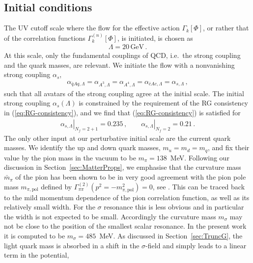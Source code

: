 \documentclass[%
reprint,
superscriptaddress,
showpacs,preprintnumbers,
 amsmath,amssymb,
 aps,
prd,
]{revtex4-1}
\def\eq#1{(\ref{#1})}
\def\sec#1{Section~\ref{#1}}
\begin{document}
\subsection{Initial conditions} \label{app:initial} The UV cutoff
scale where the flow for the effective action $\Gamma_k[\Phi]$, or
rather that of the correlation functions $\Gamma^{(n)}_k[\Phi]$, is
initiated, is chosen as
%
\begin{align}
\Lambda = 20\,\text{GeV}\,.
\end{align}
%
At this scale, only the fundamental couplings of QCD, i.e.\ the strong
coupling and the quark masses, are relevant. We initiate the flow with
a nonvanishing strong coupling $\alpha_s$,
%
\begin{align}\label{eq:initalalpha}
  \alpha_{\bar q Aq,\Lambda} =  \alpha_{A^3,\Lambda} = \alpha_{A^4,\Lambda}=
  \alpha_{\bar c A c,\Lambda}=\alpha_{s,\Lambda}\,,
\end{align}
%
such that all avatars of the strong coupling agree at the initial
scale. The initial strong coupling $\alpha_s (\Lambda)$ is constrained
by the requirement of the RG consistency in \eq{eq:RG-consistency},
and we find that \eq{eq:RG-consistency} is satisfied for
%
\begin{align}\label{eq:initalalpha-values}
  \left. \alpha_{s, \Lambda}\right|_{N_f=2+1}=0.235\,,\qquad \left.
  \alpha_{s, \Lambda}\right|_{N_f=2}=0.21\,.
\end{align}
%
The only other input at our perturbative initial scale are the current
quark masses. We identify the up and down quark masses, $m_u=m_d=m_q$,
and fix their value by the pion mass in the vacuum to be $m_\pi=138$\,
MeV. Following our discussion in \sec{sec:MatterProps}, we emphasise
that the curvature mass $\bar m_\pi$ of the pion has been shown to be
in very good agreement with the pion pole mass $m_{\pi,\textrm{pol}}$
defined by $\Gamma^{(2)}_{\pi\pi}(p^2 = -m^2_{\pi,\textrm{pol}})=0$,
see \cite{Helmboldt:2014iya, Pawlowski:2017gxj}. This can be traced
back to the mild momentum dependence of the pion correlation function,
\cite{ Helmboldt:2014iya, Mitter:2014wpa, Cyrol:2017ewj} as well as
its relatively small width. For the $\sigma$ resonance this is less
obvious and in particular the width is not expected to be
small. Accordingly the curvature mass $m_\sigma$ may not be close to
the position of the smallest scalar resonance. In the present work it
is computed to be $m_\sigma=485$\, MeV. As discussed in
\sec{sec:TruncG}, the light quark mass is absorbed in a shift in the
$\sigma$-field and simply leads to a linear term in the potential,
\end{document}
